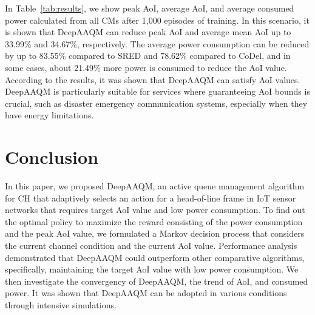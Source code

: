\documentclass[journal]{IEEEtran}
\begin{document}
In Table~\ref{tab:results}, we show peak AoI, average AoI, and average consumed power calculated from all CMs after 1,000 episodes of training. In this scenario, it is shown that DeepAAQM can reduce peak AoI and average mean AoI up to 33.99\% and 34.67\%, respectively. The average power consumption can be reduced by up to 83.55\% compared to SRED and 78.62\% compared to CoDel, and in some cases, about 21.49\% more power is consumed to reduce the AoI value. According to the results, it was shown that DeepAAQM can satisfy AoI values. DeepAAQM is particularly suitable for services where guaranteeing AoI bounds is crucial, such as disaster emergency communication systems, especially when they have energy limitations.


\section{Conclusion}
\label{sec:conclusion}
In this paper, we proposed DeepAAQM, an active queue management algorithm for CH that adaptively selects an action for a head-of-line frame in IoT sensor networks that requires target AoI value and low power consumption. 
To find out the optimal policy to maximize the reward consisting of the power consumption and the peak AoI value, we formulated a Markov decision process that considers the current channel condition and the current AoI value. Performance analysis demonstrated that DeepAAQM could outperform other comparative algorithms, specifically, maintaining the target AoI value with low power consumption. We then investigate the convergency of DeepAAQM, the trend of AoI, and consumed power. It was shown that DeepAAQM can be adopted in various conditions through intensive simulations. 


\ifCLASSOPTIONcaptionsoff
  \newpage
\fi






\end{document}
